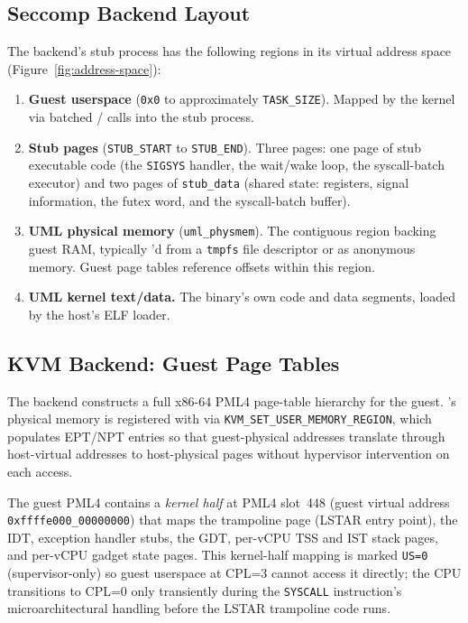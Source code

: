 \subsection{Seccomp Backend Layout}

The \Seccomp{} backend's stub process has the following regions in its
virtual address space (Figure~\ref{fig:address-space}):

\begin{enumerate}
  \item \textbf{Guest userspace} (\texttt{0x0} to approximately
        \texttt{TASK\_SIZE}).  Mapped by the \UML{} kernel via batched
        / calls into the stub process.

  \item \textbf{Stub pages} (\texttt{STUB\_START} to \texttt{STUB\_END}).
        Three pages: one page of stub executable code (the \texttt{SIGSYS}
        handler, the  wait/wake loop, the syscall-batch
        executor) and two pages of \texttt{stub\_data} (shared state:
        registers, signal information, the futex word, and the
        syscall-batch buffer).

  \item \textbf{UML physical memory} (\texttt{uml\_physmem}).
        The contiguous region backing guest RAM, typically 'd
        from a \texttt{tmpfs} file descriptor or as anonymous memory.
        Guest page tables reference offsets within this region.

  \item \textbf{UML kernel text/data.}  The \UML{} binary's own code
        and data segments, loaded by the host's ELF loader.
\end{enumerate}

\subsection{KVM Backend: Guest Page Tables}

The \KVM{} backend constructs a full x86-64 PML4 page-table hierarchy
for the guest.  \UML{}'s physical memory is registered with \KVM{}
via \texttt{KVM\_SET\_USER\_MEMORY\_REGION}, which populates EPT/NPT
entries so that guest-physical addresses translate through host-virtual
addresses to host-physical pages without hypervisor intervention on
each access.

The guest PML4 contains a \emph{kernel half} at PML4 slot~448
(guest virtual address \texttt{0xffffe000\_00000000}) that maps the
trampoline page (LSTAR entry point), the IDT, exception handler stubs,
the GDT, per-vCPU TSS and IST stack pages, and per-vCPU gadget state
pages.  This kernel-half mapping is marked \texttt{US=0}
(supervisor-only) so guest userspace at CPL=3 cannot access it
directly; the CPU transitions to CPL=0 only transiently during the
\texttt{SYSCALL} instruction's microarchitectural handling before the
LSTAR trampoline code runs.



